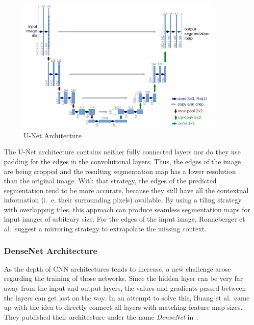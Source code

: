 \begin{figure}[h]
    \centering
    \includegraphics[width=0.9\textwidth]{images/u-net-architecture}
    \caption{U-Net Architecture \cite{unet15}}
    \label{fig:unet_architecture}
\end{figure}

The U-Net architecture contains neither fully connected layers nor do they use padding for the edges in the convolutional layers. Thus, the edges of the image are being cropped and the resulting segmentation map has a lower resolution than the original image. With that strategy, the edges of the predicted segmentation tend to be more accurate, because they still have all the contextual information (i.~e. their surrounding pixels) available. By using a tiling strategy with overlapping tiles, this approach can produce seamless segmentation maps for input images of arbitrary size. For the edges of the input image, Ronneberger et al.\ suggest a mirroring strategy to extrapolate the missing context.~\cite{unet15}

\subsubsection{DenseNet Architecture}
\label{sec:densenet}
As the depth of CNN architectures tends to increase, a new challenge arose regarding the training of those networks. Since the hidden layer can be very far away from the input and output layers, the values and gradients passed between the layers can get lost on the way. In an attempt to solve this, Huang et al.\ came up with the idea to directly connect all layers with matching feature map sizes. They published their architecture under the name \emph{DenseNet} in~\cite{densenet18}.

